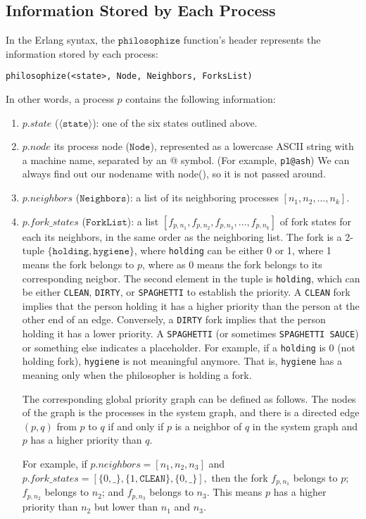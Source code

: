 \documentclass[11pt]{article}
\begin{document}
\subsection{Information Stored by Each Process}
In the Erlang syntax, the $\texttt{philosophize}$ function's header represents
the information stored by each process:
\begin{lstlisting}
philosophize(<state>, Node, Neighbors, ForksList)
\end{lstlisting}
In other words, a process $p$ contains the following information:
\begin{enumerate}
\item $p.state$ ($\langle\texttt{state}\rangle$): one of the six states outlined above.
\item $p.node$ its process node ($\texttt{Node}$), represented as a lowercase ASCII string with a machine name, separated by an @ symbol. (For example, \texttt{p1@ash}) We can always find out our nodename with node(), so it is not passed around.
\item $p.neighbors$ ($\texttt{Neighbors}$): a list of its neighboring processes $[n_1, n_2, \ldots, n_k]$.
\item $p.fork\_states$ ($\texttt{ForkList}$): a list $[f_{p, n_1}, f_{p, n_2}, f_{p, n_3}, \ldots, f_{p, n_k}]$ of fork states for each its neighbors, in the same order as the neighboring list. The fork is a 2-tuple $\{\texttt{holding}, \texttt{hygiene}\}$, where \texttt{holding} can be either 0 or 1, where 1 means the fork belongs to $p$, where as 0 means the fork belongs to its corresponding neigbor. The second element in the tuple is \texttt{holding}, which can be either \texttt{CLEAN}, \texttt{DIRTY}, or \texttt{SPAGHETTI} to establish the priority. A \texttt{CLEAN} fork implies that the person holding it has a higher priority than the person at the other end of an edge. Conversely, a \texttt{DIRTY} fork implies that the person holding it has a lower priority. A \texttt{SPAGHETTI} (or sometimes \texttt{SPAGHETTI SAUCE}) or something else indicates a placeholder. For example, if a \texttt{holding} is 0 (not holding fork), \texttt{hygiene} is not meaningful anymore. That is, \texttt{hygiene} has a meaning only when the philosopher is holding a fork.

The corresponding global priority graph can be defined as follows. The nodes of the graph is the processes in the system graph, and there is a directed edge $(p, q)$ from $p$ to $q$ if and only if $p$ is a neighbor of $q$ in the system graph and $p$ has a higher priority than $q$.

For example, if $p.neighbors = [n_1, n_2, n_3]$ and $p.fork\_states = [\{0, \_\}, \{1, \texttt{CLEAN}\}, \{0, \_\}],$ then the fork $f_{p, n_1}$ belongs to $p$; $f_{p, n_2}$ belongs to $n_2$; and $f_{p, n_3}$ belongs to $n_3$. This means $p$ has a higher priority than $n_2$ but lower than $n_1$ and $n_3$.
\end{enumerate}
\end{document}
